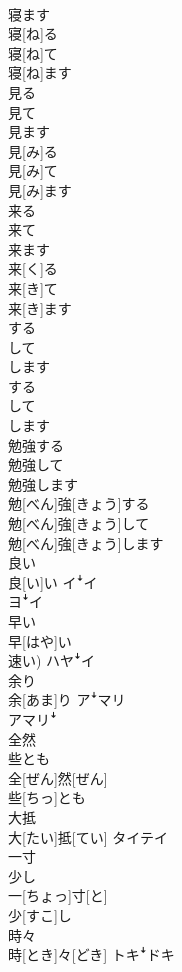\documentclass[8pt]{extreport}
\begin{document}
\begin{CJK}{UTF8}{min}
\\	寝ます	
\\	寝[ね]る 
\\	寝[ね]て 
\\	寝[ね]ます	
\\	見る 
\\	見て 
\\	見ます	
\\	見[み]る 
\\	見[み]て 
\\	見[み]ます	
\\	来る 
\\	来て 
\\	来ます	
\\	来[く]る 
\\	来[き]て 
\\	来[き]ます	
\\	する 
\\	して 
\\	します	
\\	する 
\\	して 
\\	します	
\\	勉強する 
\\	勉強して 
\\	勉強します	
\\	勉[べん]強[きょう]する 
\\	勉[べん]強[きょう]して 
\\	勉[べん]強[きょう]します	
\\	良い	
\\	良[い]い	イꜜイ 
\\	ヨꜜイ
\\	早い	
\\	早[はや]い 
\\	速い)	ハヤꜜイ
\\	余り	
\\	余[あま]り	アꜜマリ 
\\	アマリꜜ
\\	全然 
\\	些とも	
\\	全[ぜん]然[ぜん] 
\\	些[ちっ]とも	
\\	大抵	
\\	大[たい]抵[てい]	タイテイ
\\	一寸 
\\	少し	
\\	一[ちょっ]寸[と] 
\\	少[すこ]し	
\\	時々	
\\	時[とき]々[どき]	トキꜜドキ 

\end{CJK}
\end{document}
